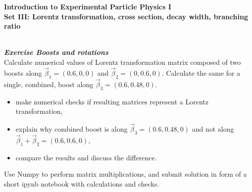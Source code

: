 \documentclass[11pt,a4paper]{article}
\newcounter{zadanie}\newcommand{\zadanie}[1][]{\addtocounter{zadanie}{1} ~\\  {\bf \emph{Exercise \arabic{zadanie} #1 }} \\}
\begin{document}
         

\begin{centering}
  {\bf {\Large
 Introduction to Experimental Particle Physics I \\
  Set III: Lorentz transformation, cross section, decay width, branching ratio
  }} \\  
\end{centering}

\vspace{1cm}
\zadanie[Boosts and rotations]

Calculate numerical values of Lorentz transformation matrix composed of two boosts
along $\vec{\beta}_1 = (0.6,0,0)$ and $\vec{\beta}_2 = (0, 0.6,0)$.
Calculate the same for a single, combined, boost along $\vec{\beta}_3 = (0.6, 0.48, 0)$.
\begin{itemize}
  \item make numerical checks if resulting matrices represent a Lorentz transformation, 
  \item explain why combined boost is along $\vec{\beta}_3 = (0.6, 0.48, 0)$ and not 
  along $\vec{\beta}_1 + \vec{\beta}_2 = (0.6, 0.6, 0)$,
  \item compare the results and discuss the difference.
\end{itemize}

\vspace{0.2cm}
Use Numpy to perform matrix multiplications, and submit solution in form of a short ipynb 
notebook with calculations and checks.
\end{document}
